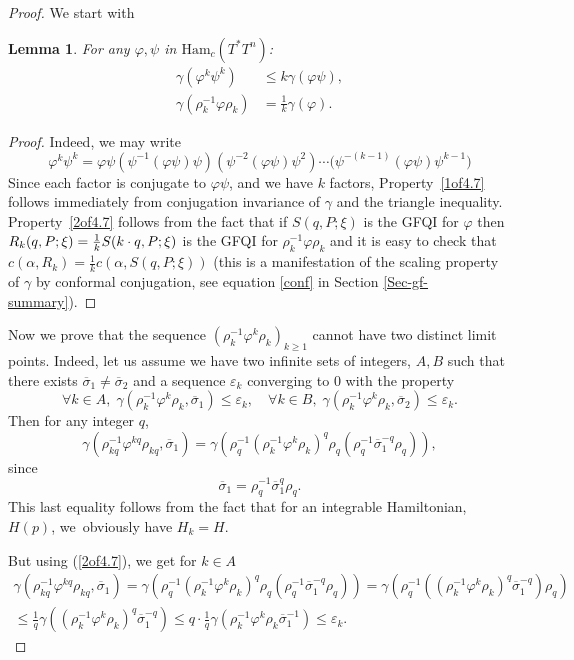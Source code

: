 \documentclass[JEP,XML,SOM,NoFloatCountersInSection,Unicode,published]{cedram}
\numberwithin{equation}{section}
\newcommand {\DHam}{\mathrm{Ham}}
\newcommand{\GFQI}{\textup{GFQI}\xspace}
\let \phi \varphi
\theoremstyle{plain}
\newtheorem{lemma}[theorem]{Lemma}
\theoremstyle{definition}
\theoremstyle{remark}
\begin{document}
\begin{proof}
We start with
\begin{lemma}\label{Lem-5.13} For any $\varphi, \psi$ in ${\DHam_c}(T^{*}T^{n})$:
\begin{align} \label{1of4.7}
\gamma (\varphi^{k}\psi^{k}) &\leq k \gamma (\varphi \psi),\\ \label{2of4.7}
\gamma (\rho^{-1}_{k} \varphi \rho_{k}) &= \frac{1}{k} \gamma (\varphi).
\end{align}
\end{lemma}
\begin{proof}
Indeed, we may write
\[
\varphi^{k} \psi^{k} = \varphi \psi \left (\psi^{-1} (\varphi \psi) \psi\right)
\left (\psi^{-2} (\varphi \psi) \psi^{2}\right)\cdots \bigl (\psi^{-(k-1)} (\varphi\psi) \psi^{k-1}\bigr)
\]
Since each factor is conjugate to $\varphi \psi$, and we have $k$
factors, Property~\eqref{1of4.7} follows immediately from conjugation invariance of $\gamma$ and the triangle inequality.
Property~\eqref{2of4.7} follows from the fact that if $S(q,P;\xi)$ is the \GFQI for $\varphi$ then $R_k(q,P;\xi)=\frac{1}{k}S(k\cdot\nobreak q, P;\xi)$ is the \GFQI for $\rho_k^{-1}\varphi\rho_k$ and it is easy to check that $c(\alpha, R_k)= \frac{1}{k}c(\alpha, S(q,P;\xi))$ (this is a manifestation of the scaling property of $\gamma$ by conformal conjugation, see equation \eqref{conf} in Section \ref{Sec-gf-summary}).
\end{proof}
Now we prove that the sequence $(\rho_{k}^{-1}\varphi^{k}\rho_{k})_{k\geq 1}$ cannot have two distinct limit points.
Indeed, let us assume we have two infinite sets of integers, $A,B$ such that there exists $\overline \sigma_{1}\neq \overline \sigma_{2}$ and a sequence $ \varepsilon_{k}$ converging to $0$ with the property
\[
\forall k\in A,\; \gamma (\rho_{k}^{-1}\varphi^{k}\rho_{k},\overline\sigma_{1})\leq \varepsilon _{k},\quad\forall k\in B,\; \gamma (\rho_{k}^{-1}\varphi^{k}\rho_{k},\overline\sigma_{2})\leq \varepsilon _{k}.
\]
Then for any integer $q$,
\[
\gamma (\rho_{kq}^{-1} \varphi^{kq}\rho_{kq}, \overline \sigma_1)= \gamma (\rho_{q}^{-1}(\rho_{k}^{-1}\phi^{k}\rho_{k})^{q}\rho_{q}(\rho_{q}^{-1} \overline\sigma_1^{-q}\rho_{q})),
\]
since
\[
\overline \sigma_1= \rho_{q}^{-1} \overline\sigma_1^{q}\rho_{q}.
\]
This last equality follows from the fact that for an integrable Hamiltonian, $H(p)$, we~obviously have $H_k=H$.

But using (\ref{2of4.7}), we get for $k\in A$
\begin{multline*}
\gamma (\rho_{kq}^{-1} \varphi^{kq}\rho_{kq}, \overline \sigma_{1})= \gamma (\rho_{q}^{-1}(\rho_{k}^{-1}\phi^{k}\rho_{k}) ^q\rho_{q}(\rho_{q}^{-1} \overline\sigma_{1}^{-q}\rho_{q})) =
\gamma (\rho_{q}^{-1}((\rho_{k}^{-1}\phi^{k}\rho_{k}) ^q \overline\sigma_{1}^{-q}) \rho_{q})\\
\leq \frac{1}{q} \gamma ((\rho_{k}^{-1}\phi^{k}\rho_{k})^{q} \overline\sigma_{1}^{-q}) \leq q \cdot \frac{1}{q} \gamma (\rho_{k}^{-1}\phi^{k}\rho_{k}\overline \sigma_{1}^{-1})\leq \varepsilon_{k}.
\end{multline*}


\end{proof}
\end{document}
